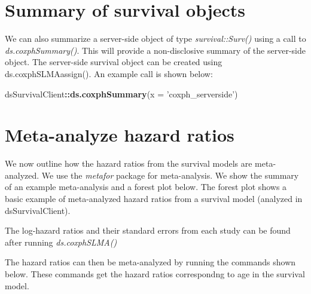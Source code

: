 \documentclass[
]{book}
\newenvironment{Shaded}{\begin{snugshade}}{\end{snugshade}}
\newcommand{\DataTypeTok}[1]{\textcolor[rgb]{0.13,0.29,0.53}{#1}}
\newcommand{\KeywordTok}[1]{\textcolor[rgb]{0.13,0.29,0.53}{\textbf{#1}}}
\newcommand{\NormalTok}[1]{#1}
\newcommand{\OperatorTok}[1]{\textcolor[rgb]{0.81,0.36,0.00}{\textbf{#1}}}
\newcommand{\StringTok}[1]{\textcolor[rgb]{0.31,0.60,0.02}{#1}}
\begin{document}
\hypertarget{summary-of-survival-objects}{%
\section{Summary of survival objects}\label{summary-of-survival-objects}}

We can also summarize a server-side object of type \emph{survival::Surv()}
using a call to \emph{ds.coxphSummary()}. This will provide a non-disclosive
summary of the server-side object. The server-side survival object can be created using ds.coxphSLMAassign().
An example call is shown below:

\begin{Shaded}
\begin{Highlighting}[]
\NormalTok{dsSurvivalClient}\OperatorTok{::}\KeywordTok{ds.coxphSummary}\NormalTok{(}\DataTypeTok{x =} \StringTok{'coxph_serverside'}\NormalTok{)}
\end{Highlighting}
\end{Shaded}

\hypertarget{meta-analyze-hazard-ratios}{%
\section{Meta-analyze hazard ratios}\label{meta-analyze-hazard-ratios}}

We now outline how the hazard ratios from the survival models are meta-analyzed.
We use the \emph{metafor} package for meta-analysis. We show the summary of an
example meta-analysis and a forest plot below. The forest plot shows a basic
example of meta-analyzed hazard ratios from a survival model (analyzed in dsSurvivalClient).

The log-hazard ratios and their standard errors from each study can be
found after running \emph{ds.coxphSLMA()}

The hazard ratios can then be meta-analyzed by running the commands shown below.
These commands get the hazard ratios correspondng to age in the survival model.
\end{document}

